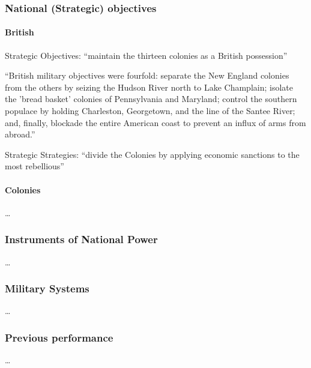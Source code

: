 \subsubsection{National (Strategic) objectives}


\paragraph{British}

Strategic Objectives: ``maintain the thirteen colonies as a British
possession''\cite[2]{moncure_cowpens_1996}

``British military objectives were fourfold: separate the New England colonies
from the others by seizing the Hudson River north to Lake Champlain; isolate the
'bread basket' colonies of Pennsylvania and Maryland; control the southern
populace by holding Charleston, Georgetown, and the line of the Santee River;
and, finally, blockade the entire American coast to prevent an influx of arms
from abroad.''\cite[2]{moncure_cowpens_1996}

Strategic Strategies: ``divide the Colonies by applying economic sanctions to
the most rebellious''\cite[2]{moncure_cowpens_1996}



\paragraph{Colonies}

\ldots

\subsubsection{Instruments of National Power}


\ldots

\subsubsection{Military Systems}

\ldots

\subsubsection{Previous performance}

\ldots
